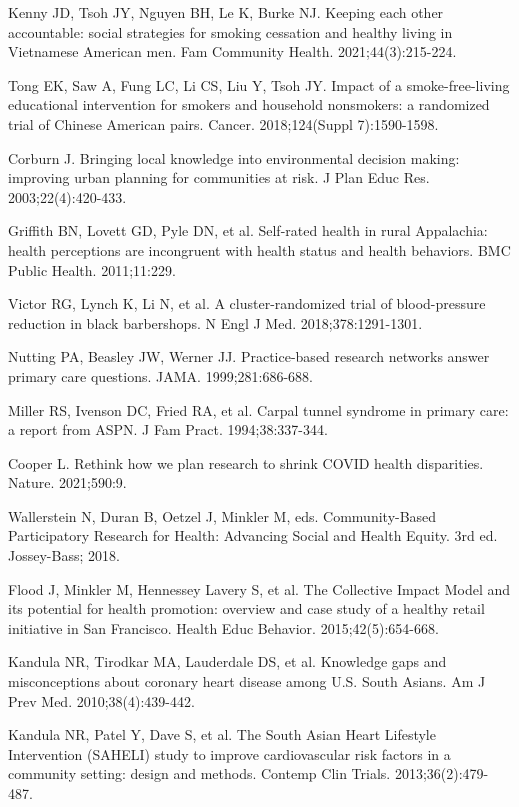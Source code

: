 \begin{references}
\item Kenny JD, Tsoh JY, Nguyen BH, Le K, Burke NJ. Keeping each other accountable: social strategies for smoking cessation and healthy living in Vietnamese American men. Fam Community Health. 2021;44(3):215-224.
\item Tong EK, Saw A, Fung LC, Li CS, Liu Y, Tsoh JY. Impact of a smoke-free-living educational intervention for smokers and household nonsmokers: a randomized trial of Chinese American pairs. Cancer. 2018;124(Suppl 7):1590-1598.
\item Corburn J. Bringing local knowledge into environmental decision making: improving urban planning for communities at risk. J Plan Educ Res. 2003;22(4):420-433.
\item Griffith BN, Lovett GD, Pyle DN, et al. Self-rated health in rural Appalachia: health perceptions are incongruent with health status and health behaviors. BMC Public Health. 2011;11:229.
\item Victor RG, Lynch K, Li N, et al. A cluster-randomized trial of blood-pressure reduction in black barbershops. N Engl J Med. 2018;378:1291-1301.
\item Nutting PA, Beasley JW, Werner JJ. Practice-based research networks answer primary care questions. JAMA. 1999;281:686-688.
\item Miller RS, Ivenson DC, Fried RA, et al. Carpal tunnel syndrome in primary care: a report from ASPN. J Fam Pract. 1994;38:337-344.
\item Cooper L. Rethink how we plan research to shrink COVID health disparities. Nature. 2021;590:9.
\item Wallerstein N, Duran B, Oetzel J, Minkler M, eds. Community-Based Participatory Research for Health: Advancing Social and Health Equity. 3rd ed. Jossey-Bass; 2018.
\item Flood J, Minkler M, Hennessey Lavery S, et al. The Collective Impact Model and its potential for health promotion: overview and case study of a healthy retail initiative in San Francisco. Health Educ Behavior. 2015;42(5):654-668.
\item Kandula NR, Tirodkar MA, Lauderdale DS, et al. Knowledge gaps and misconceptions about coronary heart disease among U.S. South Asians. Am J Prev Med. 2010;38(4):439-442.
\item Kandula NR, Patel Y, Dave S, et al. The South Asian Heart Lifestyle Intervention (SAHELI) study to improve cardiovascular risk factors in a community setting: design and methods. Contemp Clin Trials. 2013;36(2):479-487.

\end{references}
